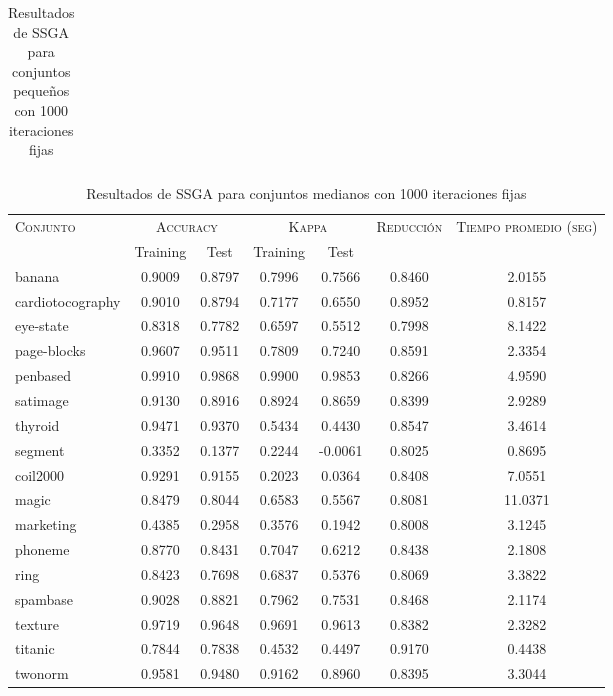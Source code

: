 \begin{table}[]
\begin{tabular}{l c c c c c c}
\hline
\end{tabular}
\caption{Resultados de SSGA para conjuntos pequeños con 1000 iteraciones fijas}
\label{res-peq-ssga}
\end{table}


\begin{table}[]
\centering
\begin{tabular}{l c c c c c c}
\hline
\multirow{2}{*}{\textsc{Conjunto}}
	& \multicolumn{2}{c}{\textsc{Accuracy}}
	& \multicolumn{2}{c}{\textsc{Kappa}}
	& \textsc{Reducción}
	& \textsc{Tiempo promedio (seg)} \\
	& Training & Test
	& Training & Test \\ 
\hline
\hline

banana & 0.9009 & 0.8797 & 0.7996 & 0.7566 & 0.8460 & 2.0155 \\
cardiotocography & 0.9010 & 0.8794 & 0.7177 & 0.6550 & 0.8952 & 0.8157 \\
eye-state & 0.8318 & 0.7782 & 0.6597 & 0.5512 & 0.7998 & 8.1422 \\
page-blocks & 0.9607 & 0.9511 & 0.7809 & 0.7240 & 0.8591 & 2.3354 \\
penbased & 0.9910 & 0.9868 & 0.9900 & 0.9853 & 0.8266 & 4.9590 \\
satimage & 0.9130 & 0.8916 & 0.8924 & 0.8659 & 0.8399 & 2.9289 \\
thyroid & 0.9471 & 0.9370 & 0.5434 & 0.4430 & 0.8547 & 3.4614 \\
segment & 0.3352 & 0.1377 & 0.2244 & -0.0061 & 0.8025 & 0.8695 \\
coil2000 & 0.9291 & 0.9155 & 0.2023 & 0.0364 & 0.8408 & 7.0551 \\
magic & 0.8479 & 0.8044 & 0.6583 & 0.5567 & 0.8081 & 11.0371 \\ 
marketing & 0.4385 & 0.2958 & 0.3576 & 0.1942 & 0.8008 & 3.1245 \\
phoneme & 0.8770 & 0.8431 & 0.7047 & 0.6212 & 0.8438 & 2.1808 \\
ring & 0.8423 & 0.7698 & 0.6837 & 0.5376 & 0.8069 & 3.3822 \\
spambase & 0.9028 & 0.8821 & 0.7962 & 0.7531 & 0.8468 & 2.1174 \\
texture & 0.9719 & 0.9648 & 0.9691 & 0.9613 & 0.8382 & 2.3282 \\
titanic & 0.7844 & 0.7838 & 0.4532 & 0.4497 & 0.9170 & 0.4438 \\
twonorm & 0.9581 & 0.9480 & 0.9162 & 0.8960 & 0.8395 & 3.3044 \\

\hline
\end{tabular}
\caption{Resultados de SSGA para conjuntos medianos con 1000 iteraciones fijas}
\label{res-med-ssga}
\end{table}


